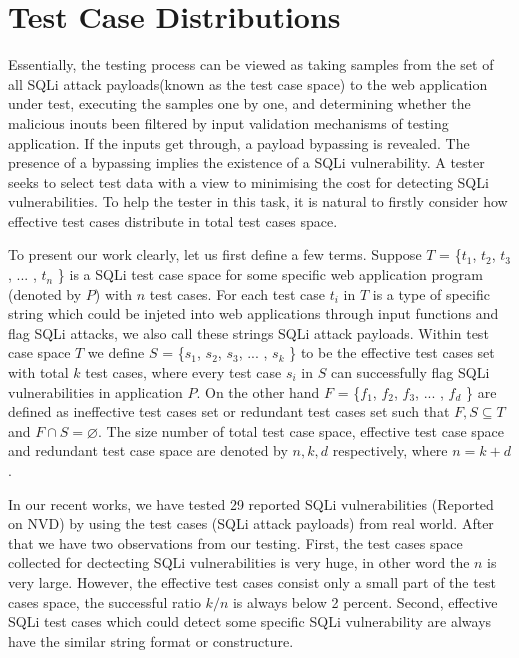 \documentclass{sig-alternate}
\begin{document}
\section{Test Case Distributions}
Essentially, the testing process can be viewed as taking samples
from the set of all SQLi attack payloads(known as the test case space) to the web application under test, executing the samples one by one, and determining whether the malicious inouts been filtered by input validation mechanisms of testing application. If the inputs get through, a payload bypassing is revealed. The presence of a bypassing implies the existence of a SQLi vulnerability. A tester seeks to select test data 
with a view to minimising the cost for detecting SQLi vulnerabilities. 
To help the tester in this task, it is natural to firstly consider how
effective test cases distribute in total test cases space.

To present our work clearly, let us first define a few terms. Suppose $\mathit{T}$ = \{$t_{1}$, $t_{2}$, $t_{3}$, ... , $t_{n}$ \} is a SQLi test case space for some specific web application program (denoted by $P$) with $n$ test cases. For each test case $t_{i}$ in $T$ is a type of specific string which could be injeted into web applications through input functions and flag SQLi attacks, we also call these strings SQLi attack payloads. Within test case space $T$ we define $S$ = \{$s_{1}$, $s_{2}$, $s_{3}$, ... , $s_{k}$ \} to be the effective test cases set with total $k$ test cases, where every test case $s_{i}$ in $S$ can successfully flag SQLi vulnerabilities in application $P$. On the other hand $F$ = \{$f_{1}$, $f_{2}$, $f_{3}$, ... , $f_{d}$ \} are defined as ineffective test cases set or redundant test cases set such that $ F, S\subseteq T$ and $F \cap S = \varnothing$.
The size number of total test case space, effective test case space and redundant test case space are denoted by $n, k, d$ respectively, where $n = k + d$.

In our recent works, we have tested 29 reported SQLi vulnerabilities (Reported on NVD) by using the test cases (SQLi attack payloads) from real world. After that we have two observations from our testing. First, the test cases space collected for dectecting SQLi vulnerabilities is very huge, in other word the $n$ is very large. However, the effective test cases consist only a small part of the test cases space, the successful ratio $k / n$ is always below 2 percent. Second, effective SQLi test cases which could detect some specific SQLi vulnerability are always have the similar string format or constructure. 
\end{document}
